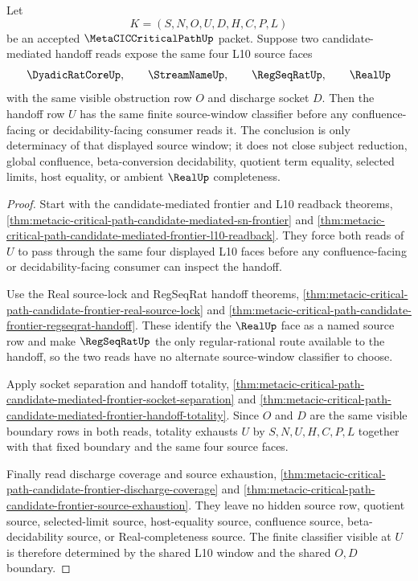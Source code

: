 \begin{theorem}
\label{thm:metacic-critical-path-candidate-frontier-source-window-determinacy}
Let
$$
K=(S,N,O,U,D,H,C,P,L)
$$
be an accepted $\MetaCICCriticalPathUp$ packet. Suppose two candidate-mediated handoff reads expose the same four L10 source faces
$$
\DyadicRatCoreUp,\qquad
\StreamNameUp,\qquad
\RegSeqRatUp,\qquad
\RealUp
$$
with the same visible obstruction row $O$ and discharge socket $D$. Then the handoff row $U$ has the same finite source-window classifier before any confluence-facing or decidability-facing consumer reads it. The conclusion is only determinacy of that displayed source window; it does not close subject reduction, global confluence, beta-conversion decidability, quotient term equality, selected limits, host equality, or ambient $\RealUp$ completeness.
\end{theorem}
\begin{proof}
Start with the candidate-mediated frontier and L10 readback theorems, \autoref{thm:metacic-critical-path-candidate-mediated-sn-frontier} and \autoref{thm:metacic-critical-path-candidate-mediated-frontier-l10-readback}. They force both reads of $U$ to pass through the same four displayed L10 faces before any confluence-facing or decidability-facing consumer can inspect the handoff.

Use the Real source-lock and RegSeqRat handoff theorems, \autoref{thm:metacic-critical-path-candidate-frontier-real-source-lock} and \autoref{thm:metacic-critical-path-candidate-frontier-regseqrat-handoff}. These identify the $\RealUp$ face as a named source row and make $\RegSeqRatUp$ the only regular-rational route available to the handoff, so the two reads have no alternate source-window classifier to choose.

Apply socket separation and handoff totality, \autoref{thm:metacic-critical-path-candidate-mediated-frontier-socket-separation} and \autoref{thm:metacic-critical-path-candidate-mediated-frontier-handoff-totality}. Since $O$ and $D$ are the same visible boundary rows in both reads, totality exhausts $U$ by $S,N,U,H,C,P,L$ together with that fixed boundary and the same four source faces.

Finally read discharge coverage and source exhaustion, \autoref{thm:metacic-critical-path-candidate-frontier-discharge-coverage} and \autoref{thm:metacic-critical-path-candidate-frontier-source-exhaustion}. They leave no hidden source row, quotient source, selected-limit source, host-equality source, confluence source, beta-decidability source, or Real-completeness source. The finite classifier visible at $U$ is therefore determined by the shared L10 window and the shared $O,D$ boundary.
\end{proof}

